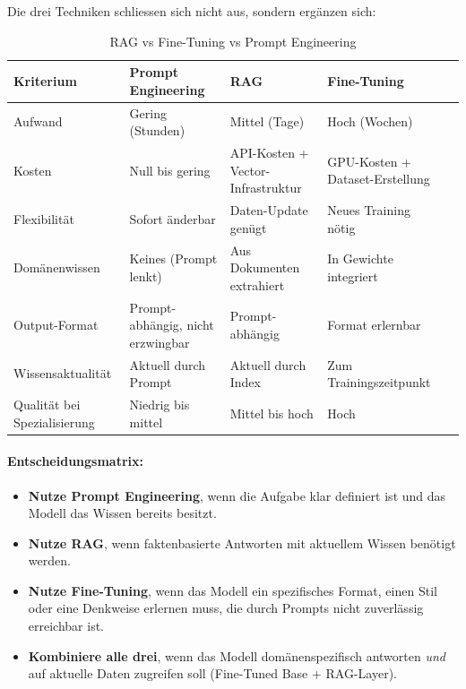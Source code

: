 Die drei Techniken schliessen sich nicht aus, sondern ergänzen sich:

\begin{table}[H]
\centering
\begin{tabularx}{\linewidth}{lXXXX}
\toprule
\textbf{Kriterium} & \textbf{Prompt Engineering} & \textbf{RAG} & \textbf{Fine-Tuning} \\
\midrule
Aufwand & Gering (Stunden) & Mittel (Tage) & Hoch (Wochen) \\
Kosten & Null bis gering & API-Kosten + Vector-Infrastruktur & GPU-Kosten + Dataset-Erstellung \\
Flexibilität & Sofort änderbar & Daten-Update genügt & Neues Training nötig \\
Domänenwissen & Keines (Prompt lenkt) & Aus Dokumenten extrahiert & In Gewichte integriert \\
Output-Format & Prompt-abhängig, nicht erzwingbar & Prompt-abhängig & Format erlernbar \\
Wissensaktualität & Aktuell durch Prompt & Aktuell durch Index & Zum Trainingszeitpunkt \\
Qualität bei Spezialisierung & Niedrig bis mittel & Mittel bis hoch & Hoch \\
\bottomrule
\end{tabularx}
\caption{RAG vs Fine-Tuning vs Prompt Engineering}
\protect\label{tab:ft-vs-rag}
\end{table}

\paragraph{Entscheidungsmatrix:}

\begin{itemize}[leftmargin=*]
    \item \textbf{Nutze Prompt Engineering}, wenn die Aufgabe klar definiert ist und das Modell das Wissen bereits besitzt.
    \item \textbf{Nutze RAG}, wenn faktenbasierte Antworten mit aktuellem Wissen benötigt werden.
    \item \textbf{Nutze Fine-Tuning}, wenn das Modell ein spezifisches Format, einen Stil oder eine Denkweise erlernen muss, die durch Prompts nicht zuverlässig erreichbar ist.
    \item \textbf{Kombiniere alle drei}, wenn das Modell domänenspezifisch antworten \textit{und} auf aktuelle Daten zugreifen soll (Fine-Tuned Base + RAG-Layer).
\end{itemize}

